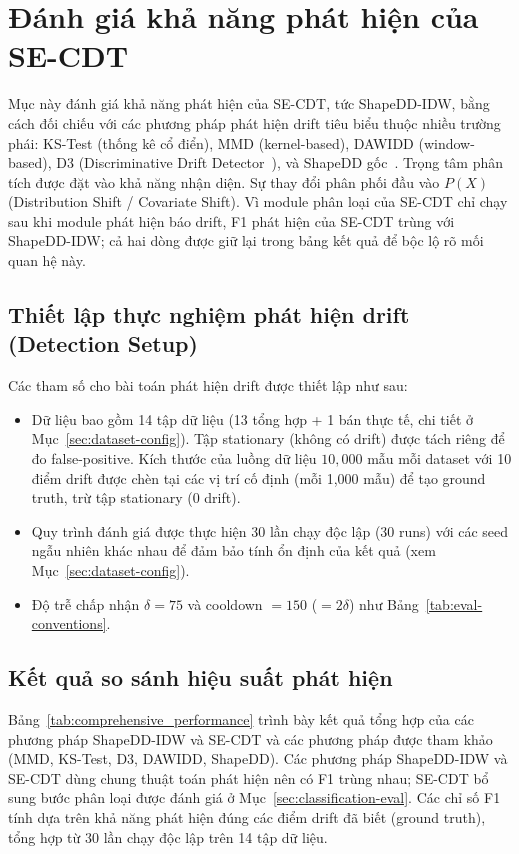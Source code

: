 \section{Đánh giá khả năng phát hiện của SE-CDT}
\label{sec:detection-eval}

Mục này đánh giá khả năng phát hiện của SE-CDT, tức ShapeDD-IDW, bằng cách đối chiếu với các phương pháp phát hiện drift tiêu biểu thuộc nhiều trường phái: KS-Test (thống kê cổ điển), MMD (kernel-based), DAWIDD (window-based), D3 (Discriminative Drift Detector~\cite{gozuacik2019d3}), và ShapeDD gốc~\cite{shapeDD2021}. Trọng tâm phân tích được đặt vào khả năng nhận diện. Sự thay đổi phân phối đầu vào $P(X)$ (Distribution Shift / Covariate Shift). Vì module phân loại của SE-CDT chỉ chạy sau khi module phát hiện báo drift, F1 phát hiện của SE-CDT trùng với ShapeDD-IDW; cả hai dòng được giữ lại trong bảng kết quả để bộc lộ rõ mối quan hệ này.

\subsection{Thiết lập thực nghiệm phát hiện drift (Detection Setup)}
Các tham số cho bài toán phát hiện drift được thiết lập như sau:
\begin{itemize}
	\item Dữ liệu bao gồm 14 tập dữ liệu (13 tổng hợp + 1 bán thực tế, chi tiết ở Mục~\ref{sec:dataset-config}). Tập stationary (không có drift) được tách riêng để đo false-positive. Kích thước của luồng dữ liệu $10{,}000$ mẫu mỗi dataset với 10 điểm drift được chèn tại các vị trí cố định (mỗi 1{,}000 mẫu) để tạo ground truth, trừ tập stationary (0 drift).
	\item Quy trình đánh giá được thực hiện 30 lần chạy độc lập (30 runs) với các seed ngẫu nhiên khác nhau để đảm bảo tính ổn định của kết quả (xem Mục~\ref{sec:dataset-config}).
	\item Độ trễ chấp nhận $\delta = 75$ và cooldown $= 150$ ($=2\delta$) như Bảng~\ref{tab:eval-conventions}.
\end{itemize}

\subsection{Kết quả so sánh hiệu suất phát hiện}

Bảng~\ref{tab:comprehensive_performance} trình bày kết quả tổng hợp của các phương pháp ShapeDD-IDW và SE-CDT và các phương pháp được tham khảo (MMD, KS-Test, D3, DAWIDD, ShapeDD). Các phương pháp ShapeDD-IDW và SE-CDT dùng chung thuật toán phát hiện nên có F1 trùng nhau; SE-CDT bổ sung bước phân loại được đánh giá ở Mục~\ref{sec:classification-eval}. Các chỉ số F1 tính dựa trên khả năng phát hiện đúng các điểm drift đã biết (ground truth), tổng hợp từ 30 lần chạy độc lập trên 14 tập dữ liệu.

